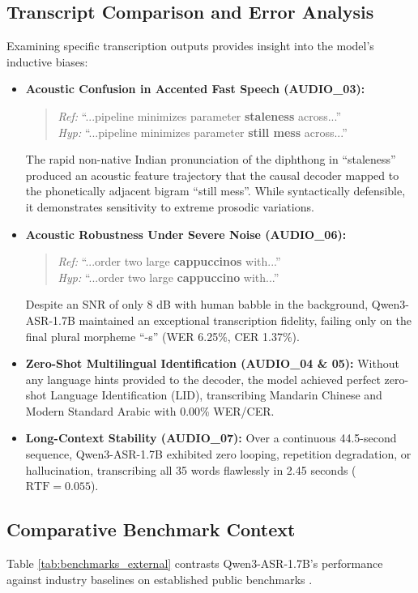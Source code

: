 \documentclass[conference]{IEEEtran}
\begin{document}
\subsection{Transcript Comparison and Error Analysis}
Examining specific transcription outputs provides insight into the model's inductive biases:
\begin{itemize}
    \item \textbf{Acoustic Confusion in Accented Fast Speech (AUDIO\_03):}
    \begin{quote}
    \textit{Ref:} ``...pipeline minimizes parameter \textbf{staleness} across...''\\
    \textit{Hyp:} ``...pipeline minimizes parameter \textbf{still mess} across...''
    \end{quote}
    The rapid non-native Indian pronunciation of the diphthong in ``staleness'' produced an acoustic feature trajectory that the causal decoder mapped to the phonetically adjacent bigram ``still mess''. While syntactically defensible, it demonstrates sensitivity to extreme prosodic variations.
    \item \textbf{Acoustic Robustness Under Severe Noise (AUDIO\_06):}
    \begin{quote}
    \textit{Ref:} ``...order two large \textbf{cappuccinos} with...''\\
    \textit{Hyp:} ``...order two large \textbf{cappuccino} with...''
    \end{quote}
    Despite an SNR of only 8 dB with human babble in the background, Qwen3-ASR-1.7B maintained an exceptional transcription fidelity, failing only on the final plural morpheme ``-s'' (WER 6.25\%, CER 1.37\%).
    \item \textbf{Zero-Shot Multilingual Identification (AUDIO\_04 \& 05):}
    Without any language hints provided to the decoder, the model achieved perfect zero-shot Language Identification (LID), transcribing Mandarin Chinese and Modern Standard Arabic with 0.00\% WER/CER.
    \item \textbf{Long-Context Stability (AUDIO\_07):}
    Over a continuous 44.5-second sequence, Qwen3-ASR-1.7B exhibited zero looping, repetition degradation, or hallucination, transcribing all 35 words flawlessly in 2.45 seconds ($\text{RTF} = 0.055$).
\end{itemize}

\subsection{Comparative Benchmark Context}
Table \ref{tab:benchmarks_external} contrasts Qwen3-ASR-1.7B's performance against industry baselines on established public benchmarks \cite{qwen2025qwen3asr, radford2023whisper}.
\end{document}
